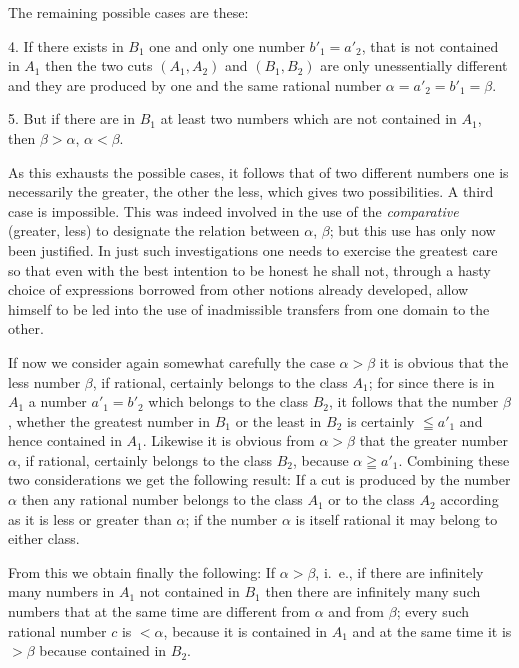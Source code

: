 \documentclass[polutonikogreek,english,twoside,openright]{article}
\begin{document}
The remaining possible cases are these:

4. If there exists in $B_1$ one and only one number $b'_1 = a'_2$,
that is not contained in $A_1$ then the two cuts $(A_1, A_2)$ and
$(B_1, B_2)$ are only unessentially different and they are produced by
one and the same rational number $\alpha = a'_2 = b'_1 = \beta$.

5. But if there are in $B_1$ at least two numbers which are not
contained in $A_1$, then $\beta > \alpha$, $\alpha < \beta$.

As this exhausts the possible cases, it follows that of two different
numbers one is necessarily the greater, the other the less, which
gives two possibilities. A third case is impossible. This was indeed
involved in the use of the \textit{comparative} (greater, less) to
designate the relation between $\alpha$, $\beta$; but this use has
only now been justified. In just such investigations one needs to
exercise the greatest care so that even with the best intention to be
honest he shall not, through a hasty choice of expressions borrowed
from other notions already developed, allow himself to be led into the
use of inadmissible transfers from one domain to the other.

If now we consider again somewhat carefully the case $\alpha>\beta$ it
is obvious that the less number $\beta$, if rational, certainly
belongs to the class $A_1$; for since there is in $A_1$ a number
$a'_1=b'_2$ which belongs to the class $B_2$, it follows that the
number $\beta$, whether the greatest number in $B_1$ or the least in
$B_2$ is certainly $\leqq a'_1$ and hence contained in $A_1$. Likewise
it is obvious from $\alpha>\beta$ that the greater number $\alpha$, if
rational, certainly belongs to the class $B_2$, because
$\alpha \geqq a'_1$. Combining these two considerations we get the
following result: If a cut is produced by the number $\alpha$ then any
rational number belongs to the class $A_1$ or to the class $A_2$
according as it is less or greater than $\alpha$; if the number
$\alpha$ is itself rational it may belong to either class.

From this we obtain finally the following: If $\alpha>\beta$, i.~e.,
if there are infinitely many numbers in $A_1$ not contained in $B_1$
then there are infinitely many such numbers that at the same time are
different from $\alpha$ and from $\beta$; every such rational number
$c$ is $<\alpha$, because it is contained in $A_1$ and at the same
time it is $>\beta$ because contained in $B_2$.
\end{document}
